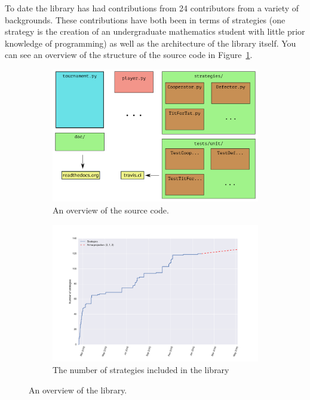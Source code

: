 \documentclass{article}
\begin{document}
To date the library has had contributions from 24 contributors from a variety
of backgrounds. These contributions have both been in terms of strategies (one
strategy is the creation of an undergraduate mathematics student with little
prior knowledge of programming) as well as the architecture of the library
itself. You can see an overview of the structure of the source code in
Figure~\ref{fig:overview}.

\begin{figure}[!hbtp]
	\begin{subfigure}{.5\textwidth}
		\centering
		\includegraphics[width=\textwidth]{../img/outline_of_library.pdf}
		\caption{An overview of the source code.}
		\label{fig:overview}
	\end{subfigure}
	\begin{subfigure}{.5\textwidth}
		\centering
		\includegraphics[width=\textwidth]{../img/number_of_strategies_with_arima_projection.pdf}
		\caption{The number of strategies included in the library}
		\label{fig:number_of_strategies_against_date}
	\end{subfigure}
	\caption{An overview of the library.}
\end{figure}
\end{document}
